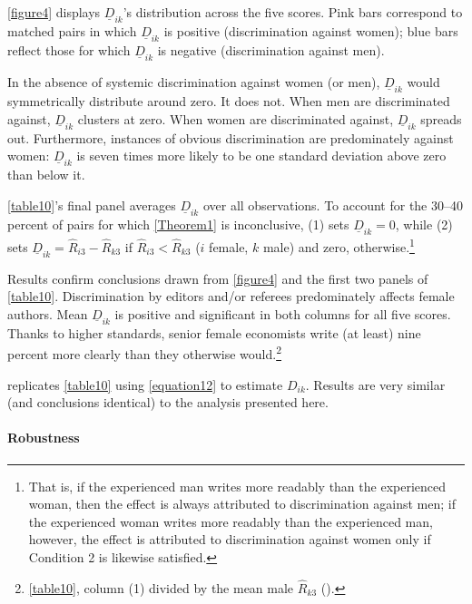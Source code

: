 \autoref{figure4} displays $\underline D_{ik}$'s distribution across the five scores. Pink bars correspond to matched pairs in which $\underline D_{ik}$ is positive (discrimination against women); blue bars reflect those for which $\underline D_{ik}$ is negative (discrimination against men).

In the absence of systemic discrimination against women (or men), $\underline D_{ik}$ would symmetrically distribute around zero. It does not. When men are discriminated against, $\underline D_{ik}$ clusters at zero. When women are discriminated against, $\underline D_{ik}$ spreads out. Furthermore, instances of obvious discrimination are predominately against women: $\underline D_{ik}$ is seven times more likely to be one standard deviation above zero than below it.

\autoref{table10}'s final panel averages $\underline D_{ik}$ over all observations. To account for the 30--40 percent of pairs for which \autoref{Theorem1} is inconclusive, (1) sets $\underline D_{ik}=0$, while (2) sets $\underline D_{ik}=\widehat R_{i3}-\widehat R_{k3}$ if $\widehat R_{i3}<\widehat R_{k3}$ ($i$ female, $k$ male) and zero, otherwise.\footnote{That is, if the experienced man writes more readably than the experienced woman, then the effect is always attributed to discrimination against men; if the experienced woman writes more readably than the experienced man, however, the effect is attributed to discrimination against women only if Condition 2 is likewise satisfied.}

Results confirm conclusions drawn from \autoref{figure4} and the first two panels of \autoref{table10}. Discrimination by editors and\slash or referees predominately affects female authors. Mean $\underline D_{ik}$ is positive and significant in both columns for all five scores. Thanks to higher standards, senior female economists write (at least) nine percent more clearly than they otherwise would.\footnote{\autoref{table10}, column (1) divided by the mean male $\widehat R_{k3}$ ().}



 replicates \autoref{table10} using \autoref{equation12} to estimate $D_{ik}$. Results are very similar (and conclusions identical) to the analysis presented here.

\paragraph{Robustness}
\label{matchinglimitations}

